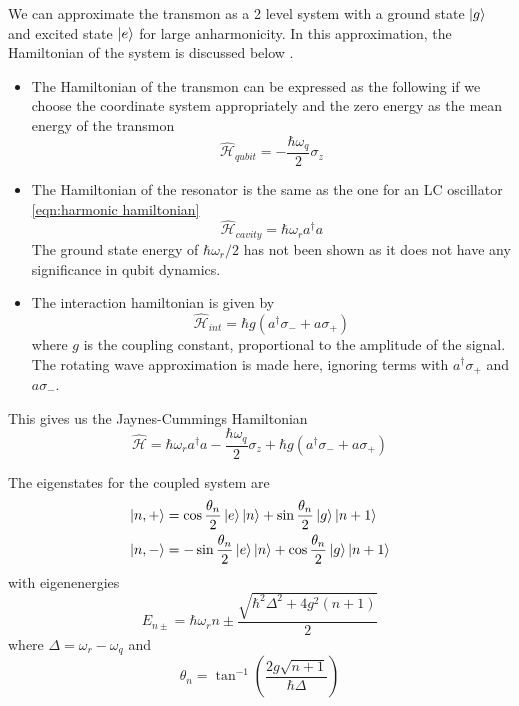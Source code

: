 We can approximate the transmon as a 2 level system with a ground state $\ket{g}$ and excited state $\ket{e}$ for large anharmonicity. In this approximation, the Hamiltonian of the system is discussed below  \cite{Richer2013,Schuster2007}.
\begin{itemize}
\item The Hamiltonian of the transmon can be expressed as the following if we choose the coordinate system appropriately and the zero energy as the mean energy of the transmon
\begin{equation}
\hat{\mathcal{H}}_{qubit}=-\frac{\hbar\omega_q}{2}\sigma_z
\label{eqn:qubit free hamiltonian}
\end{equation}
\item The Hamiltonian of the resonator is the same as the one for  an LC oscillator \ref{eqn:harmonic hamiltonian}
\begin{equation}
\hat{\mathcal{H}}_{cavity}=\hbar\omega_ra^\dag a
\end{equation}
The ground state energy of $\hbar\omega_r/2$ has not been shown as it does not have any significance in qubit dynamics.
\item The interaction hamiltonian is given by 
\begin{equation}
\hat{\mathcal{H}}_{int}=\hbar g(a^\dag\sigma_-+a\sigma_+)
\end{equation}
where $g$ is the coupling constant, proportional to the amplitude of the signal. The rotating wave approximation is made here, ignoring terms with $a^\dag\sigma_+$ and $a\sigma_-$.
\end{itemize}

This gives us the Jaynes-Cummings Hamiltonian
\begin{equation}
\hat{\mathcal{H}}=\hbar\omega_ra^\dag a-\frac{\hbar\omega_q}{2}\sigma_z+\hbar g(a^\dag\sigma_-+a\sigma_+)
\end{equation}

The eigenstates for the coupled system are
\begin{subequations}
\label{eqn:coupled eigenstates}
\begin{align}
\ket{n,+} &= \cos\frac{\theta_n}{2}\ket{e}\ket{n}+\sin\frac{\theta_n}{2}\ket{g}\ket{n+1}\\
\ket{n,-} &= -\sin\frac{\theta_n}{2}\ket{e}\ket{n}+\cos\frac{\theta_n}{2}\ket{g}\ket{n+1}
\end{align}
\end{subequations}
with eigenenergies
\begin{equation}
E_{n\pm}=\hbar\omega_r n\pm\frac{\sqrt{\hbar^2\Delta^2+4g^2(n+1)}}{2}
\end{equation}
where $\Delta=\omega_r-\omega_q$ and
\begin{equation}
\theta_n = \tan^{-1}\left(\frac{2g\sqrt{n+1}}{\hbar \Delta}\right)
\end{equation}

